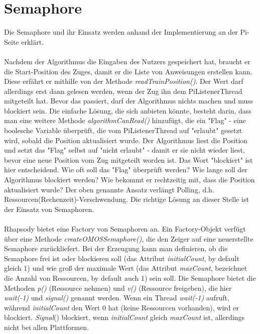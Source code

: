 \chapter{Semaphore}
Die Semaphore und ihr Einsatz werden anhand der Implementierung an der Pi-Seite erklärt.\\
\\
Nachdem der Algorithmus die Eingaben des Nutzers gespeichert hat, braucht er die Start-Position des Zuges, damit er die Liste von Anweisungen erstellen kann. Diese erfährt er mithilfe von der Methode \textit{readTrainPosition()}. Der Wert darf allerdings erst dann gelesen werden, wenn der Zug ihn dem PiListenerThread mitgeteilt hat. Bevor das passiert, darf der Algorithmus nichts machen und muss blockiert sein. Die einfache Lösung, die sich anbieten könnte, besteht darin, dass man eine weitere Methode \textit{algorithmCanRead()} hinzufügt, die ein "Flag" - eine boolesche Variable überprüft, die vom PiListenerThread auf "erlaubt" gesetzt wird, sobald die Position aktualisiert wurde. Der Algorithmus liest die Position und setzt das "Flag" selbst auf "nicht erlaubt" - damit er sie nicht wieder liest, bevor eine neue Position vom Zug mitgeteilt worden ist. Das Wort "blockiert" ist hier entscheidend. Wie oft soll das "Flag" überprüft werden? Wie lange soll der Algorithmus blockiert werden? Wie bekommt er rechtzeitig mit, dass die Position aktualisiert wurde? Der oben genannte Ansatz verlängt Polling, d.h. Ressourcen(Rechenzeit)-Verschwendung. Die richtige Lösung an dieser Stelle ist der Einsatz von Semaphoren.\\
\\
Rhapsody bietet eine Factory von Semaphoren an. Ein Factory-Objekt verfügt über eine Methode \textit{createOMOSSemaphore()}, die den Zeiger auf eine neuerstellte Semaphore zurückliefert. Bei der Erzeugung kann man definieren, ob die Semaphore frei ist oder blockieren soll (das Attribut \textit{initialCount}, by default gleich 1) und wie groß der maximale Wert (das Attribut \textit{maxCount}, bezeichnet die Anzahl von Ressourcen, by default auch 1) sein soll. Die Semaphore bietet die Methoden \textit{p()} (Ressource nehmen) und \textit{v()} (Ressource freigeben), die hier \textit{wait(-1)} und \textit{signal()} genannt werden. Wenn ein Thread \textit{wait(-1)} aufruft, während \textit{initialCount} den Wert 0 hat (keine Ressourcen vorhanden), wird er blockiert. \textit{Signal}() blockiert, wenn \textit{initialCount} gleich \textit{maxCount} ist, allerdings nicht bei allen Plattformen.\\
